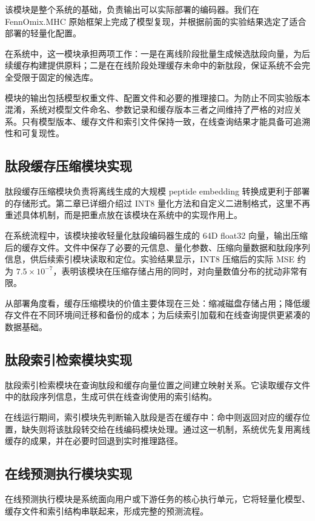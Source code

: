 该模块是整个系统的基础，负责输出可以实际部署的编码器。我们在 FennOmix.MHC 原始框架上完成了模型复现，并根据前面的实验结果选定了适合部署的轻量化配置。

在系统中，这一模块承担两项工作：一是在离线阶段批量生成候选肽段向量，为后续缓存构建提供原料；二是在在线阶段处理缓存未命中的新肽段，保证系统不会完全受限于固定的候选库。

模块的输出包括模型权重文件、配置文件和必要的推理接口。为防止不同实验版本混淆，系统对模型文件命名、参数记录和缓存版本三者之间维持了严格的对应关系。只有模型版本、缓存文件和索引文件保持一致，在线查询结果才能具备可追溯性和可复现性。

\subsection{肽段缓存压缩模块实现}

肽段缓存压缩模块负责将离线生成的大规模 peptide embedding 转换成更利于部署的存储形式。第二章已详细介绍过 INT8 量化方法和自定义二进制格式，这里不再重述具体机制，而是把重点放在该模块在系统中的实现作用上。

在系统流程中，该模块接收轻量化肽段编码器生成的 64D float32 向量，输出压缩后的缓存文件。文件中保存了必要的元信息、量化参数、压缩向量数据和肽段序列信息，供后续索引模块读取和定位。实验结果显示，INT8 压缩后的实际 MSE 约为 $7.5 \times 10^{-7}$，表明该模块在压缩存储占用的同时，对向量数值分布的扰动非常有限。

从部署角度看，缓存压缩模块的价值主要体现在三处：缩减磁盘存储占用；降低缓存文件在不同环境间迁移和备份的成本；为后续索引加载和在线查询提供更紧凑的数据基础。

\subsection{肽段索引检索模块实现}

肽段索引检索模块在查询肽段和缓存向量位置之间建立映射关系。它读取缓存文件中的肽段序列信息，生成可供在线查询使用的索引结构。

在线运行期间，索引模块先判断输入肽段是否在缓存中：命中则返回对应的缓存位置，缺失则将该肽段转交给在线编码模块处理。通过这一机制，系统优先复用离线缓存的成果，并在必要时回退到实时推理路径。

\subsection{在线预测执行模块实现}

在线预测执行模块是系统面向用户或下游任务的核心执行单元，它将轻量化模型、缓存文件和索引结构串联起来，形成完整的预测流程。


